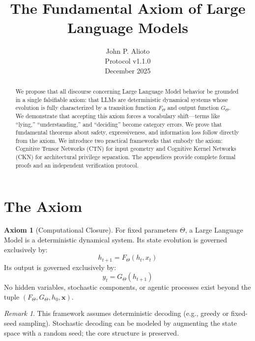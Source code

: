 \documentclass[11pt]{article}
\title{\textbf{The Fundamental Axiom of Large Language Models}}
\author{John P. Alioto\\[0.5em]\small Protocol v1.1.0\\[0.5em]\small December 2025}
\date{}
\theoremstyle{definition}
\newtheorem{axiom}{Axiom}
\theoremstyle{remark}
\newtheorem{remark}{Remark}[section]
\begin{document}
\maketitle

\begin{abstract}
We propose that all discourse concerning Large Language Model behavior be grounded in a single falsifiable axiom: that LLMs are deterministic dynamical systems whose evolution is fully characterized by a transition function $F_\Theta$ and output function $G_\Theta$. We demonstrate that accepting this axiom forces a vocabulary shift---terms like ``lying,'' ``understanding,'' and ``deciding'' become category errors. We prove that fundamental theorems about safety, expressiveness, and information loss follow directly from the axiom. We introduce two practical frameworks that embody the axiom: Cognitive Tensor Networks (CTN) for input geometry and Cognitive Kernel Networks (CKN) for architectural privilege separation. The appendices provide complete formal proofs and an independent verification protocol.
\end{abstract}

\vspace{1em}

\section{The Axiom}

\begin{axiom}[Computational Closure]
For fixed parameters $\Theta$, a Large Language Model is a deterministic dynamical system. Its state evolution is governed exclusively by:
\begin{equation}
h_{t+1} = F_\Theta(h_t, x_t)
\end{equation}
Its output is governed exclusively by:
\begin{equation}
y_t = G_\Theta(h_{t+1})
\end{equation}
No hidden variables, stochastic components, or agentic processes exist beyond the tuple $(F_\Theta, G_\Theta, h_0, \mathbf{x})$.
\end{axiom}

\begin{remark}
This framework assumes deterministic decoding (e.g., greedy or fixed-seed sampling). Stochastic decoding can be modeled by augmenting the state space with a random seed; the core structure is preserved.
\end{remark}
\end{document}
